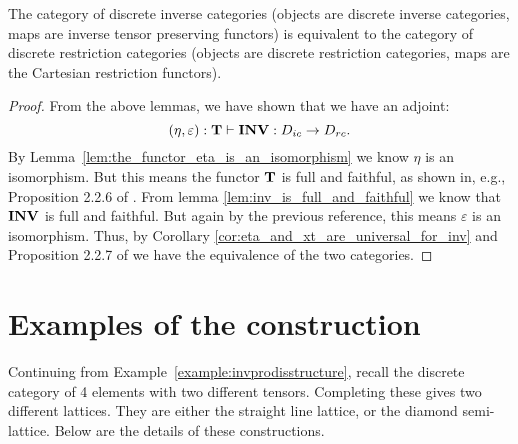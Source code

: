 \begin{theorem}\label{thm:discrete_inverse_categories_are_equivalent_to_discrete_restriction_categories}
  The category of discrete inverse categories (objects are discrete inverse categories, maps are
  inverse tensor preserving functors) is equivalent to the category of discrete restriction
  categories (objects are discrete restriction categories, maps are the Cartesian restriction
  functors).
\end{theorem}
\begin{proof}
  From the above lemmas, we have shown that we have an adjoint:
  \begin{equation}
    (\eta,\varepsilon):\mathbf{T} \vdash \mathbf{INV} :D_{i c} \to D_{r c}. \label{eq:inv_and_wtf_are_adjoint_pair}
  \end{equation}
  By Lemma~\ref{lem:the_functor_eta_is_an_isomorphism} we know $\eta$ is an isomorphism. But this
  means the functor $\mathbf{T}$ is full and faithful, as shown in, e.g., Proposition 2.2.6 of
  \cite{cockett2009:ctcs}. From lemma \ref{lem:inv_is_full_and_faithful} we know that $\mathbf{INV}$ is
  full and faithful. But again by the previous reference, this means $\varepsilon$ is an
  isomorphism. Thus, by Corollary \ref{cor:eta_and_xt_are_universal_for_inv} and Proposition 2.2.7
  of \cite{cockett2009:ctcs} we have the equivalence of the two categories.
\end{proof}
\section{Examples of the \texorpdfstring{\wtc}{tilde} construction} %
\label{sec:examples_of_the_wtf_construction}

\begin{example}
  \label{example:completing_a_finite_discrete_inverse_category}
\end{example}
Continuing from Example~\ref{example:invprodisstructure}, recall the discrete category of 4
elements with two different tensors. Completing these gives two different lattices. They are either
the straight line lattice, or the diamond semi-lattice. Below are the details of these constructions.

